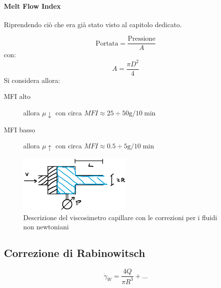 \paragraph{Melt Flow Index}
Riprendendo ciò che era già stato visto al capitolo dedicato.

\begin{equation}
\text{Portata} = \frac{\text{Pressione}}{A}
\end{equation}
con:
\begin{equation}
A = \frac{\pi D^2}{4}
\end{equation}
Si considera allora:
\begin{description}
\item[MFI alto] allora $\mu \downarrow$ con circa
$MFI \approx 25 \div 50 \unit{\g/10\min}$
\item[MFI basso] allora $\mu \uparrow$ con circa
$MFI \approx 0.5 \div 5 \unit{\g/10\min}$
\end{description}

\begin{figure}
\centering
\includegraphics[width = 0.5\textwidth]{gfx/CorrezioneCapillare}
\caption{Descrizione del viscosimetro capillare con le correzioni per i fluidi non newtoniani}\label{fig:CorrezioneCapillare}
\end{figure}

\subsection{Correzione di Rabinowitsch}
\begin{equation}
\dot{\gamma}_W = \frac{4 Q}{\pi R^3} + \ldots
\end{equation}

